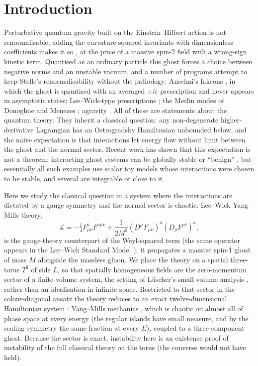 \documentclass[11pt,a4paper]{article}
\begin{document}
\section{Introduction}

Perturbative quantum gravity built on the Einstein--Hilbert action is not renormalisable; adding
the curvature-squared invariants with dimensionless coefficients makes it so \cite{Stelle77}, at
the price of a massive spin-2 field with a wrong-sign kinetic term. Quantised as an ordinary
particle this ghost forces a choice between negative norms and an unstable vacuum, and a number of
programs attempt to keep Stelle's renormalisability without the pathology: Anselmi's fakeons
\cite{Anselmi17,Anselmi18}, in which the ghost is quantised with an averaged $\pm i\epsilon$
prescription and never appears in asymptotic states; Lee--Wick-type prescriptions
\cite{LeeWick,GOW08}; the Merlin modes of Donoghue and Menezes \cite{DonoghueMenezes}; agravity
\cite{SalvioStrumia}. All of these are statements about the quantum theory. They inherit a
classical question: any non-degenerate higher-derivative Lagrangian has an Ostrogradsky
Hamiltonian unbounded below, and the naive expectation is that interactions let energy flow
without limit between the ghost and the normal sector. Recent work has shown that this expectation
is not a theorem: interacting ghost systems can be globally stable or ``benign''
\cite{DMV22,DamourSmilga,Smilga}, but essentially all such examples use scalar toy models whose
interactions were chosen to be stable, and several are integrable or close to it.

Here we study the classical question in a system where the interactions are dictated by a gauge
symmetry and the normal sector is chaotic. Lee--Wick Yang--Mills theory,
\begin{equation}
\mathcal L=-\tfrac14F^a_{\mu\nu}F^{a\mu\nu}+\frac1{2M^2}(D^\mu F_{\mu\nu})^a(D_\rho F^{\rho\nu})^a,
\label{eq:LWYM}
\end{equation}
is the gauge-theory counterpart of the Weyl-squared term (the same operator appears in the
Lee--Wick Standard Model \cite{GOW08}); it propagates a massive spin-1 ghost of mass $M$ alongside
the massless gluon. We place the theory on a spatial three-torus $T^3$ of side $L$, so that
spatially homogeneous fields are the zero-momentum sector of a finite-volume system, the setting
of L\"uscher's small-volume analysis \cite{Luscher83}, rather than an idealisation in infinite
space. Restricted to that sector in the colour-diagonal ansatz the theory
reduces to an exact twelve-dimensional Hamiltonian system \cite{note:derive}: Yang--Mills
mechanics \cite{MatinyanSavvidy,Savvidy}, which is chaotic on almost all of phase space at every
energy (the regular islands \cite{DahlqvistRussberg} have small measure, and by the scaling
symmetry the same fraction at every $E$), coupled to a three-component ghost. Because the sector is exact, instability here is an existence proof of
instability of the full classical theory on the torus (the converse would not have held).
\end{document}
